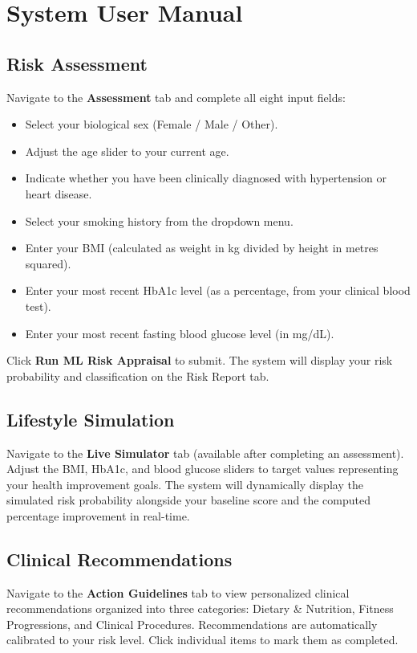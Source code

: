 \documentclass[12pt,a4paper]{report}
\begin{document}
\section{System User Manual}

\subsection{Risk Assessment}
Navigate to the \textbf{Assessment} tab and complete all eight input fields:
\begin{itemize}
    \item Select your biological sex (Female / Male / Other).
    \item Adjust the age slider to your current age.
    \item Indicate whether you have been clinically diagnosed with hypertension or heart disease.
    \item Select your smoking history from the dropdown menu.
    \item Enter your BMI (calculated as weight in kg divided by height in metres squared).
    \item Enter your most recent HbA1c level (as a percentage, from your clinical blood test).
    \item Enter your most recent fasting blood glucose level (in mg/dL).
\end{itemize}
Click \textbf{Run ML Risk Appraisal} to submit. The system will display your risk probability and classification on the Risk Report tab.

\subsection{Lifestyle Simulation}
Navigate to the \textbf{Live Simulator} tab (available after completing an assessment). Adjust the BMI, HbA1c, and blood glucose sliders to target values representing your health improvement goals. The system will dynamically display the simulated risk probability alongside your baseline score and the computed percentage improvement in real-time.

\subsection{Clinical Recommendations}
Navigate to the \textbf{Action Guidelines} tab to view personalized clinical recommendations organized into three categories: Dietary \& Nutrition, Fitness Progressions, and Clinical Procedures. Recommendations are automatically calibrated to your risk level. Click individual items to mark them as completed.
\end{document}
